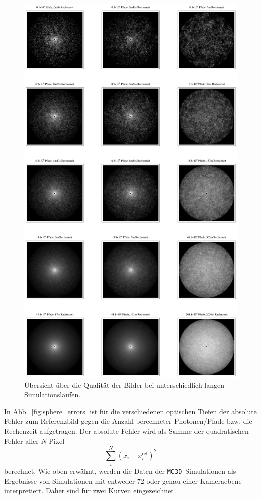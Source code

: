 		\begin{figure}
			\centering
			\includegraphics[height=1.0\textheight]{piratesphereimageoverview.eps}
			\caption{Übersicht über die Qualität der Bilder bei unterschiedlich langen \pirate--Simulationsläufen.}
			\label{fig:pirate_sphere_imageoverview}
		\end{figure}
	
	
	In Abb.~\ref{fig:sphere_errors} ist für die verschiedenen optischen Tiefen der absolute Fehler zum Referenzbild gegen die Anzahl berechneter Photonen/Pfade bzw. die Rechenzeit aufgetragen. Der absolute Fehler wird als Summe der quadratischen Fehler aller $N$ Pixel
	$$\sum_i^N (x_i-x_i^\text{ref})^2$$
	berechnet. Wie oben erwähnt, werden die Daten der \texttt{MC3D}--Simulationen als Ergebnisse von Simulationen mit entweder 72 oder genau einer Kameraebene interpretiert. Daher sind für \mctd zwei Kurven eingezeichnet.
	

